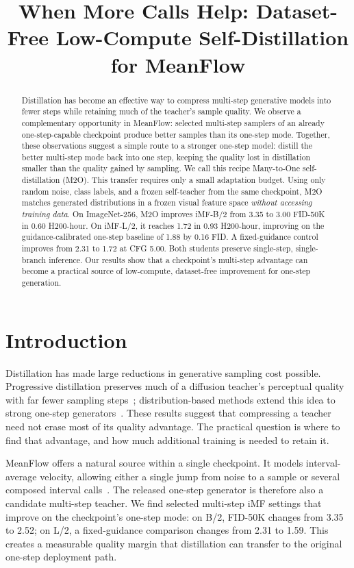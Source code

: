 \documentclass{article}
\title{When More Calls Help: Dataset-Free Low-Compute Self-Distillation for MeanFlow}
\begin{document}
\maketitle
\fancyhead{}
\begin{abstract}
Distillation has become an effective way to compress multi-step generative
models into fewer steps while retaining much of the teacher's sample quality.
We observe a complementary opportunity in MeanFlow: selected multi-step
samplers of an already one-step-capable checkpoint produce better samples
than its one-step mode. Together, these observations suggest a simple route
to a stronger one-step model: distill the better multi-step mode back into
one step, keeping the quality lost in distillation smaller than the quality
gained by sampling. We call this recipe Many-to-One self-distillation (M2O).
This transfer requires only a small adaptation budget.
Using only random noise, class labels, and a frozen self-teacher from the
same checkpoint, M2O matches generated distributions in a frozen visual
feature space \emph{without accessing training data}. On ImageNet-256,
M2O improves iMF-B/2 from 3.35 to 3.00 FID-50K in 0.60 H200-hour.
On iMF-L/2, it reaches 1.72 in 0.93 H200-hour, improving on the
guidance-calibrated one-step baseline of 1.88 by 0.16 FID. A fixed-guidance
control improves from 2.31 to 1.72 at CFG 5.00. Both students preserve
single-step, single-branch inference.
Our results show that a checkpoint's
multi-step advantage can become a practical source of low-compute,
dataset-free improvement for one-step generation.
\end{abstract}

\section{Introduction}
Distillation has made large reductions in generative sampling cost possible.
Progressive distillation preserves much of a diffusion teacher's perceptual
quality with far fewer sampling steps~\citep{salimans2022progressive};
distribution-based methods extend this idea to strong one-step
generators~\citep{yin2023dmd,zhou2024sid,yin2024dmd2}. These results suggest
that compressing a teacher need not erase most of its quality advantage.
The practical question is where to find that advantage, and how much
additional training is needed to retain it.

MeanFlow offers a natural source within a single checkpoint. It models
interval-average velocity, allowing either a single jump from noise to a
sample or several composed interval calls~\citep{geng2025meanflow,geng2025improved}.
The released one-step generator is therefore also a candidate multi-step
teacher. We find selected multi-step iMF settings that improve on the
checkpoint's one-step mode: on B/2, FID-50K changes from 3.35 to 2.52;
on L/2, a fixed-guidance comparison changes from 2.31 to 1.59.
This creates a measurable quality margin that distillation can transfer to
the original one-step deployment path.
\end{document}
